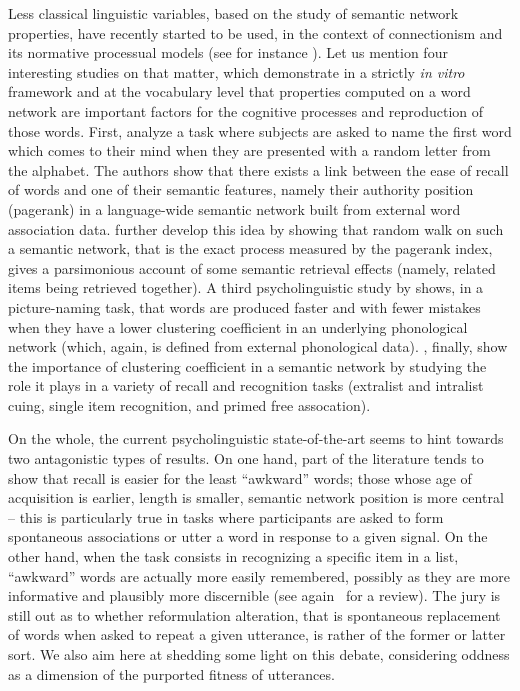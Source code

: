 Less classical linguistic variables, based on the study of semantic network properties, have recently started to be used, in the context of connectionism and its normative processual models (see for instance \citet{collins1975spreading}).
Let us mention four interesting studies on that matter, which demonstrate in a strictly \emph{in vitro} framework and at the vocabulary level that properties computed on a word network are important factors for the cognitive processes and reproduction of those words.
First, \citet{Griffiths07} analyze a task where subjects are asked to name the first word which comes to their mind when they are presented with a random letter from the %
alphabet. The authors show that there exists a link between the ease of recall of words and one of their semantic features, namely their authority position (pagerank) in a language-wide semantic network built from external word association data.
\citet{austerweil2012human} further develop this idea by showing that random walk on such a semantic network, that is the exact process measured by the pagerank index, gives a parsimonious account of some semantic retrieval effects (namely, related items being retrieved together).
A third psycholinguistic study by \citet{Chan10} shows, in a picture-naming task, that words are produced faster and with fewer mistakes when they have a lower clustering coefficient in an underlying phonological network (which, again, is  defined from external phonological data).
\citet{nelson2013activation}, finally, show the importance of clustering coefficient in a semantic network by studying the role it plays in a variety of recall and recognition tasks (extralist and intralist cuing, single item recognition, and primed free assocation).

On the whole, the current psycholinguistic state-of-the-art seems to hint towards two antagonistic types of results.
On one hand, part of the literature tends to show that recall is easier for the least ``awkward'' words; those whose age of acquisition is earlier, length is smaller, semantic network position is more central -- this is particularly true in tasks where participants are asked to form spontaneous associations or utter a word in response to a given signal.
On the other hand, when the task consists in recognizing a specific item in a list, ``awkward'' words are actually more easily remembered, possibly as they are more informative and plausibly more discernible (see again~\citet{Yonelinas02} for a review).
The jury is still out as to whether reformulation alteration, that is spontaneous replacement of words when asked to repeat a given utterance, is rather of the former or latter sort.
We also aim here at shedding some light on this debate, considering oddness as a dimension of the purported fitness of utterances.
